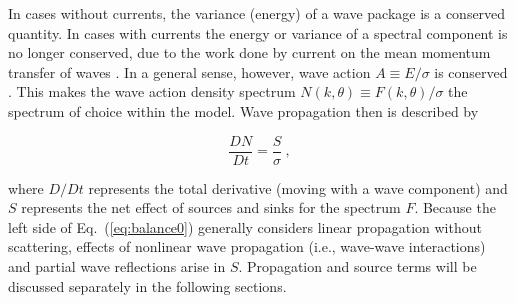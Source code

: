 In cases without currents, the variance (energy) of a wave package is a
conserved quantity. In cases with currents the energy or variance of a
spectral component is no longer conserved, due to the work done by current on
the mean momentum transfer of waves \citep{art:LHS61,art:LHS62}. In a general
sense, however, wave action $A \equiv E/\sigma$ is conserved
\citep[e.g.,][]{art:Whi65,art:BG68}. This makes the wave action density
spectrum $N(k,\theta) \equiv F(k,\theta)/\sigma$ the spectrum of choice within
the model. Wave propagation then is described by


\begin{equation}
\frac{D N}{D t} = \frac{S}{\sigma} \: ,
\label{eq:balance0}
\end{equation}

\noindent 
where $D/Dt$ represents the total derivative (moving with a wave component)
and $S$ represents the net effect of sources and sinks for the spectrum
$F$. Because the left side of Eq.~(\ref{eq:balance0}) generally considers
linear propagation without scattering, effects of nonlinear wave propagation
(i.e., wave-wave interactions) and partial wave reflections arise in
$S$. Propagation and source terms will be discussed separately in the
following sections.
